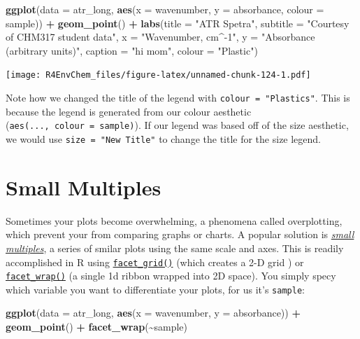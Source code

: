 \documentclass[
]{book}
\newenvironment{Shaded}{\begin{snugshade}}{\end{snugshade}}
\newcommand{\AttributeTok}[1]{\textcolor[rgb]{0.13,0.29,0.53}{#1}}
\newcommand{\FunctionTok}[1]{\textcolor[rgb]{0.13,0.29,0.53}{\textbf{#1}}}
\newcommand{\NormalTok}[1]{#1}
\newcommand{\SpecialCharTok}[1]{\textcolor[rgb]{0.81,0.36,0.00}{\textbf{#1}}}
\newcommand{\StringTok}[1]{\textcolor[rgb]{0.31,0.60,0.02}{#1}}
\begin{document}
\begin{Shaded}
\begin{Highlighting}[]
\FunctionTok{ggplot}\NormalTok{(}\AttributeTok{data =}\NormalTok{ atr\_long, }
       \FunctionTok{aes}\NormalTok{(}\AttributeTok{x =}\NormalTok{ wavenumber, }
           \AttributeTok{y =}\NormalTok{ absorbance, }
           \AttributeTok{colour =}\NormalTok{ sample)) }\SpecialCharTok{+}
  \FunctionTok{geom\_point}\NormalTok{() }\SpecialCharTok{+}
  \FunctionTok{labs}\NormalTok{(}\AttributeTok{title =} \StringTok{"ATR Spetra"}\NormalTok{,}
       \AttributeTok{subtitle =} \StringTok{"Courtesy of CHM317 student data"}\NormalTok{,}
       \AttributeTok{x =} \StringTok{"Wavenumber, cm\^{}{-}1"}\NormalTok{,}
       \AttributeTok{y =} \StringTok{"Absorbance (arbitrary units)"}\NormalTok{,}
       \AttributeTok{caption =} \StringTok{"hi mom"}\NormalTok{,}
       \AttributeTok{colour =} \StringTok{"Plastic"}\NormalTok{)}
\end{Highlighting}
\end{Shaded}

\texttt{[image: R4EnvChem\_files/figure-latex/unnamed-chunk-124-1.pdf]}

Note how we changed the title of the legend with \texttt{colour\ =\ "Plastics"}. This is because the legend is generated from our colour aesthetic (\texttt{aes(...,\ colour\ =\ sample)}). If our legend was based off of the size aesthetic, we would use \texttt{size\ =\ "New\ Title"} to change the title for the size legend.

\hypertarget{small-multiples}{%
\section{Small Multiples}\label{small-multiples}}

Sometimes your plots become overwhelming, a phenomena called overplotting, which prevent your from comparing graphs or charts. A popular solution is \href{https://en.wikipedia.org/wiki/Small_multiple}{\emph{small multiples}}, a series of smilar plots using the same scale and axes. This is readily accomplished in R using \href{https://ggplot2-book.org/facet.html}{\texttt{facet\_grid()}} (which creates a 2-D grid ) or \href{https://ggplot2-book.org/facet.html}{\texttt{facet\_wrap()}} (a single 1d ribbon wrapped into 2D space). You simply specy which variable you want to differentiate your plots, for us it's \texttt{sample}:

\begin{Shaded}
\begin{Highlighting}[]
\FunctionTok{ggplot}\NormalTok{(}\AttributeTok{data =}\NormalTok{ atr\_long, }
       \FunctionTok{aes}\NormalTok{(}\AttributeTok{x =}\NormalTok{ wavenumber, }
           \AttributeTok{y =}\NormalTok{ absorbance)) }\SpecialCharTok{+}
  \FunctionTok{geom\_point}\NormalTok{() }\SpecialCharTok{+}
  \FunctionTok{facet\_wrap}\NormalTok{(}\SpecialCharTok{\textasciitilde{}}\NormalTok{sample)}
\end{Highlighting}
\end{Shaded}
\end{document}
